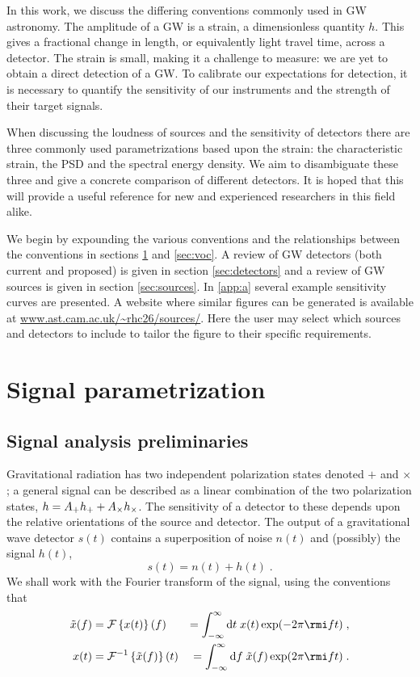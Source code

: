 In this work, we discuss the differing conventions commonly used in GW astronomy. The amplitude of a GW is a strain, a dimensionless quantity $h$. This gives a fractional change in length, or equivalently light travel time, across a detector. The strain is small, making it a challenge to measure: we are yet to obtain a direct detection
of a GW. To calibrate our expectations for detection, it is necessary to quantify the sensitivity of our instruments and the strength of their target signals.

When discussing the loudness of sources and the sensitivity of detectors there are three commonly used parametrizations based upon the strain: the characteristic strain, the PSD and the spectral energy density. We aim to disambiguate these three and give a concrete comparison of different detectors. It is hoped that this will provide a useful reference for new and experienced researchers in this field alike. 

We begin by expounding the various conventions and the relationships between the conventions in sections \ref{sec:conventions} and \ref{sec:voc}. A review of GW detectors (both current and proposed) is given in section \ref{sec:detectors} and a review of GW sources is given in section \ref{sec:sources}. In \ref{app:a} several example sensitivity curves are presented. A website where similar figures can be generated is available at \url{www.ast.cam.ac.uk/~rhc26/sources/}. Here the user may select which sources and detectors to include to tailor the figure to their specific requirements.


\section{Signal parametrization}\label{sec:conventions}

\subsection{Signal analysis preliminaries}

Gravitational radiation has two independent polarization states denoted $+$ and $\times$; a general signal can be described as a linear combination of the two polarization states, $h \nobreak=\nobreak A_{+} h_{+}\nobreak +\nobreak A_{\times} h_{\times}$. The sensitivity of a detector to these depends upon the relative orientations of the source and detector. The output of a gravitational wave detector $s(t)$ contains a superposition of noise $n(t)$ and (possibly) the signal $h(t)$,
\begin{equation}
s(t) = n(t)+h(t) \; .
\end{equation}
We shall work with the Fourier transform of the signal, using the conventions that
\begin{eqnarray} \label{eq:defFourier}
\tilde{x}(f) &= {\mathcal{F}}\left\{x(t)\right\}(f) &= \int_{-\infty}^{\infty}\mathrm{d}t\;x(t)\exp (-2\pi \rmi f t ) \; , \\
x(t) &= {\mathcal{F}}^{-1}\left\{\tilde{x}(f)\right\}(t) &= \int_{-\infty}^{\infty}\mathrm{d}f\;\tilde{x}(f)\exp (2\pi \rmi f t ) \; .
\end{eqnarray}

